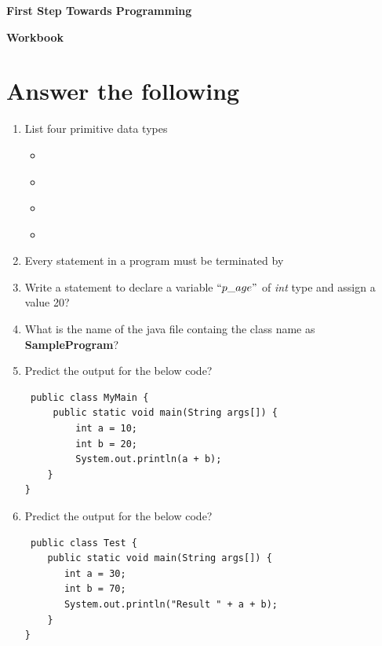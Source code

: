 \documentclass[11pt,a4paper]{article}
\def\AnswerBox{\fbox{\begin{minipage}{4in}\hfill\vspace{0.5in}\end{minipage}}}
\begin{document}
\centerline{\huge{ \textbf{First Step Towards Programming}}}
\vspace{1pc}
\centerline{\Large{\textbf{Workbook}}}
\vspace{1pc}
\section*{Answer the following}
\begin{enumerate}
\item List four primitive data types
\begin{itemize}
\item \  
\item \ 
\item \ 
\item \ 
\end{itemize}
\item Every statement in a program must be terminated by \underline{\hspace{5cm}}
\item Write a statement to declare a variable $``p\_age"$ of \emph{int} type and assign a value 20? \underline{\hspace{5cm}}
\item What is the name of the java file containg the class name as \\ \textbf{SampleProgram}? \underline{\hspace{5cm}}
\item Predict the output for the below code?

\begin{lstlisting}
 public class MyMain {
     public static void main(String args[]) {
         int a = 10;
         int b = 20;
         System.out.println(a + b);  
    }  
}
\end{lstlisting}
\AnswerBox


\item Predict the output for the below code?

\begin{lstlisting}
 public class Test {
    public static void main(String args[]) {
       int a = 30;
       int b = 70;
       System.out.println("Result " + a + b);  
    }   
}
\end{lstlisting}
\AnswerBox
\end{enumerate}
\end{document}
